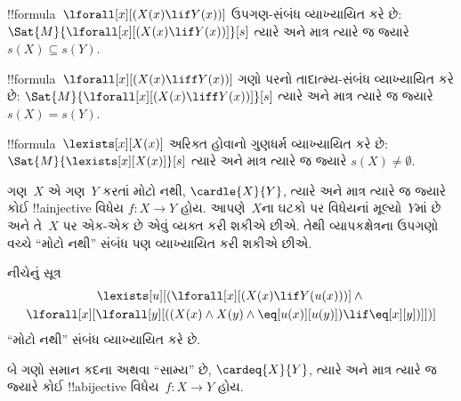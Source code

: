 \documentclass[../../../include/open-logic-section]{subfiles}
\begin{document}


\begin{prop}
!!{formula}~$\lforall[x][(X(x) \lif Y(x))]$ ઉપગણ-સંબંધ
વ્યાખ્યાયિત કરે છે: $\Sat{M}{\lforall[x][(X(x) \lif Y(x))]}[s]$
ત્યારે અને માત્ર ત્યારે જ જ્યારે $s(X) \subseteq s(Y)$.
\end{prop}

\begin{prop}
!!{formula}~$\lforall[x][(X(x) \liff Y(x))]$ ગણો પરનો
તાદાત્મ્ય-સંબંધ વ્યાખ્યાયિત કરે છે: $\Sat{M}{\lforall[x][(X(x)
\liff Y(x))]}[s]$ ત્યારે અને માત્ર ત્યારે જ જ્યારે $s(X) = s(Y)$.
\end{prop}

\begin{prop}
!!{formula}~$\lexists[x][X(x)]$ અરિક્ત હોવાનો ગુણધર્મ વ્યાખ્યાયિત
કરે છે: $\Sat{M}{\lexists[x][X(x)]}[s]$ ત્યારે અને માત્ર ત્યારે જ
જ્યારે $s(X) \neq \emptyset$.
\end{prop}

ગણ~$X$ એ ગણ~$Y$ કરતાં મોટો નથી, $\cardle{X}{Y}$, ત્યારે અને માત્ર
ત્યારે જ જ્યારે કોઈ !!a{injective} વિધેય $f\colon X \to Y$ હોય.
આપણે~$X$ના ઘટકો પર વિધેયનાં મૂલ્યો~$Y$માં છે અને તે~$X$ પર
એક-એક છે એવું વ્યક્ત કરી શકીએ છીએ. તેથી વ્યાપકક્ષેત્રના ઉપગણો વચ્ચે ``મોટો નથી''
સંબંધ પણ વ્યાખ્યાયિત કરી શકીએ છીએ.

\begin{prop}
નીચેનું સૂત્ર
\begin{multline*}
\lexists[u][(\lforall[x][(X(x) \lif Y(u(x)))] \land {}\\
\lforall[x][\lforall[y][((X(x) \land X(y) \land \eq[u(x)][u(y)]) \lif
      \eq[x][y])]])]
\end{multline*}
``મોટો નથી'' સંબંધ વ્યાખ્યાયિત કરે છે.
\end{prop}


બે ગણો સમાન કદના અથવા ``સામ્ય'' છે, $\cardeq{X}{Y}$, ત્યારે અને
માત્ર ત્યારે જ જ્યારે કોઈ !!a{bijective} વિધેય~$f\colon X \to Y$
હોય.
\end{document}
